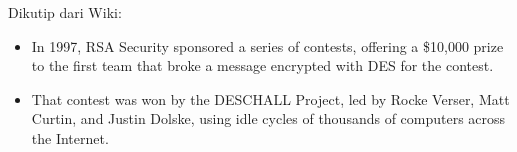 \documentclass{article}
\begin{document}

Dikutip dari Wiki:\
\begin{itemize}
    \item In 1997, RSA Security sponsored a series of contests, offering a \$10,000 prize to the first team that broke a message encrypted with DES for the contest.
    \item That contest was won by the DESCHALL Project, led by Rocke Verser, Matt Curtin, and Justin Dolske, using idle cycles of thousands of computers across the Internet.
\end{itemize}
\end{document}
